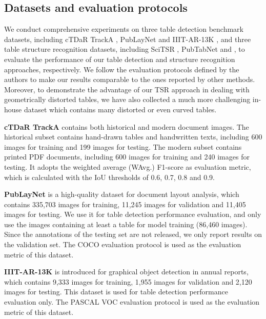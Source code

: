 \documentclass[final,3p,times,twocolumn]{elsarticle}
\begin{document}
\subsection{Datasets and evaluation protocols}
\label{subsec:data}
We conduct comprehensive experiments on three table detection benchmark datasets, including cTDaR TrackA \cite{gao2019icdar}, PubLayNet \cite{zhong2019publaynet} and IIIT-AR-13K \cite{mondal2020iiit}, and three table structure recognition datasets, including SciTSR \cite{chi2019complicated}, PubTabNet \cite{zhong2020image} and {\color{black}{cTDaR TrackB2-Modern}} \cite{gao2019icdar}, to evaluate the performance of our table detection and structure recognition approaches, respectively. We follow the evaluation protocols defined by the authors to make our results comparable to the ones reported by other methods. Moreover, to demonstrate the advantage of our TSR approach in dealing with geometrically distorted tables, we have also collected a much more challenging in-house dataset which contains many distorted or even curved tables.

\textbf{cTDaR TrackA} \cite{gao2019icdar} contains both historical and modern document images. The historical subset contains hand-drawn tables and handwritten texts, including 600 images for training and 199 images for testing. The modern subset contains printed PDF documents, including 600 images for training and 240 images for testing. It adopts the weighted average (WAvg.) F1-score as evaluation metric, which is calculated with the IoU thresholds of 0.6, 0.7, 0.8 and 0.9.

\textbf{PubLayNet} \cite{zhong2019publaynet} is a high-quality dataset for document layout analysis, which contains 335,703 images for training, 11,245 images for validation and 11,405 images for testing. We use it for table detection performance evaluation, and only use the images containing at least a table for model training (86,460 images). Since the annotations of the testing set are not released, we only report results on the validation set. The COCO evaluation protocol is used as the evaluation metric of this dataset.

\textbf{IIIT-AR-13K} \cite{mondal2020iiit} is introduced for graphical object detection in annual reports, which contains 9,333 images for training, 1,955 images for validation and 2,120 images for testing. This dataset is used for table detection performance evaluation only. The PASCAL VOC evaluation protocol is used as the evaluation metric of this dataset. 
\end{document}
